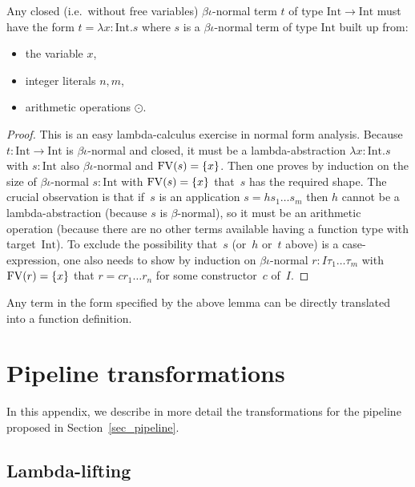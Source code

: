 \documentclass[final]{msc}
\begin{document}
\begin{lemma}
  Any closed (i.e.~without free variables) $\beta\iota$-normal term
  $t$ of type $\mathrm{Int} \to \mathrm{Int}$ must have the form $t =
  \lambda x : \mathrm{Int} . s$ where $s$ is a $\beta\iota$-normal
  term of type $\mathrm{Int}$ built up from:
  \begin{itemize}
  \item the variable $x$,
  \item integer literals $n, m$,
  \item arithmetic operations $\odot$.
  \end{itemize}
\end{lemma}

\begin{proof}
  This is an easy lambda-calculus exercise in normal form
  analysis. Because $t : \mathrm{Int} \to \mathrm{Int}$ is
  $\beta\iota$-normal and closed, it must be a lambda-abstraction
  $\lambda x : \mathrm{Int} . s$ with $s : \mathrm{Int}$ also
  $\beta\iota$-normal and $\mathrm{FV}(s) = \{x\}$. Then one proves by
  induction on the size of $\beta\iota$-normal $s : \mathrm{Int}$ with
  $\mathrm{FV}(s) = \{x\}$ that~$s$ has the required shape. The crucial
  observation is that if~$s$ is an application $s = h s_1 \ldots s_m$
  then $h$ cannot be a lambda-abstraction (because $s$ is
  $\beta$-normal), so it must be an arithmetic operation (because
  there are no other terms available having a function type with
  target~$\mathrm{Int}$). To exclude the possibility that~$s$ (or~$h$
  or~$t$ above) is a case-expression, one also needs to show by
  induction on $\beta\iota$-normal $r : I \tau_1 \ldots \tau_m$ with
  $\mathrm{FV}(r) = \{x\}$ that $r = c r_1 \ldots r_n$ for some constructor~$c$
  of~$I$.
\end{proof}

Any term in the form specified by the above lemma can be directly
translated into a \VampIR{} function definition.

\section{Pipeline transformations}\label{sec_transformations}

In this appendix, we describe in more detail the transformations for
the pipeline proposed in Section~\ref{sec_pipeline}.

\subsection{Lambda-lifting}
\end{document}
